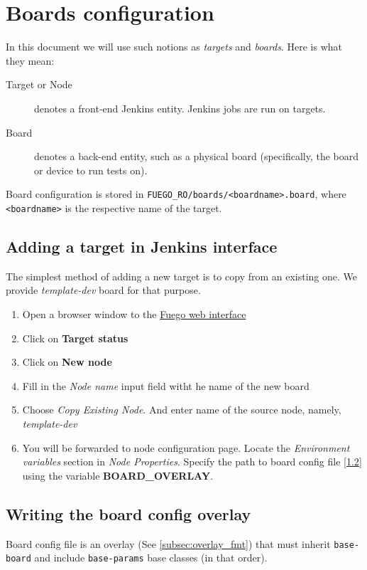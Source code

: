 \section{Boards configuration}
In this document we will use such notions as \textit{targets} and \textit{boards}. Here is what they mean:
\begin{description}
\item[Target or Node] denotes a front-end Jenkins entity. Jenkins jobs are run on targets.
\item[Board] denotes a back-end entity, such as a physical board (specifically, the board or device to run tests on).
\end{description}

Board configuration is stored in \texttt{FUEGO\_RO/boards/<boardname>.board},
where \texttt{<boardname>} is the respective name of the target.

\subsection{Adding a target in Jenkins interface}
\label{sec:target-add}
The simplest method of adding a new target is to copy from an existing one.
We provide \textit{template-dev} board for that purpose.
\begin{enumerate}
\item Open a browser window to the \href{http://localhost:8080/}{Fuego web interface}
\item Click on \textbf{Target status}
\item Click on \textbf{New node}
\item Fill in the \textit{Node name} input field witht he name of the new board
\item Choose \textit{Copy Existing Node}. And enter name of the source node, namely, \textit{template-dev}
\item You will be forwarded to node configuration page.
Locate the \textit{Environment variables} section in \textit{Node Properties}.
Specify the path to board config file [\ref{sec:board_config}] using the variable \textbf{BOARD\_OVERLAY}.
\end{enumerate}

\subsection{Writing the board config overlay}
\label{sec:board_config}
Board config file is an overlay (See \ref{subsec:overlay_fmt}) that must inherit \texttt{base-board} and include \texttt{base-params} base classes (in that order).

